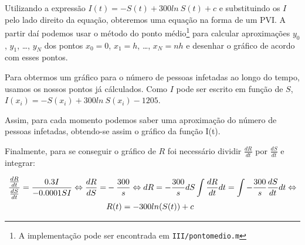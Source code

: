 \documentclass[portuguese, a4paper]{article}
\newcommand\tu[0]{\textunderscore}
\newcommand\eq[0]{\Leftrightarrow}
\begin{document}


		\subsubsection{} \label{sec:III.2c)}
		\par
		Utilizando a expressão $I(t) = -S(t) + 300ln~S(t) + c$ e substituindo
		os $I$ pelo lado direito da equação, obteremos uma equação na forma de
		um PVI\@. A partir daí podemos usar o método do ponto médio\footnote{A
		implementação pode ser encontrada em \texttt{III/ponto\tu medio.m}}
		para calcular aproximações $y_0$, $y_1$, \ldots, $y_N$ dos pontos $x_0
		= 0$, $x_1 = h$, \ldots, $x_N = nh$ e desenhar o gráfico de acordo
		com esses pontos.

		\par
		Para obtermos um gráfico para o número de pessoas infetadas ao longo do
		tempo, usamos os nossos pontos já cálculados. Como $I$ pode ser escrito
		em função de $S$, $I(x_i) = -S(x_i) + 300ln~S(x_i) - 1205$.

		\par
		Assim, para cada momento podemos saber uma aproximação do número de
		pessoas infetadas, obtendo-se assim	o gráfico da função I(t).

		\par \null \par
		Finalmente, para se conseguir o gráfico de $R$ foi necessário
		dividir $\frac{dR}{dt}$ por $\frac{dS}{dt}$ e integrar:

		\begin{equation}
		\begin{split}
			\frac{\frac{dR}{dt}}{\frac{dS}{dt}} = \frac{0.3 I}{-0.0001 S I}
			\eq
			\frac{dR}{dS} = &-\frac{300}{s} \eq dR =
			-\frac{300}{s} dS
			\int \frac{dR}{dt}dt = \int -\frac{300}{s} \frac{dS}{dt}dt
			\eq \\ \newline
			& R(t) = -300 ln(S(t)) + c
		\end{split}
		\end{equation}
\end{document}

